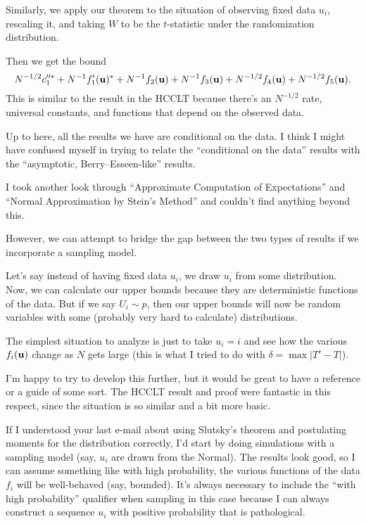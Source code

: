 \documentclass{amsart}
\begin{document}
Similarly, we apply our theorem to the situation of observing fixed data $u_i$, rescaling it, and
taking $W$ to be the $t$-statistic under the randomization distribution.

Then we get the bound
\begin{equation*}
  N^{-1/2} c''^\ast_1 + N^{-1} f'_1({\bf u})^\ast + N^{-1} f_2({\bf u}) +
  N^{-1} f_3({\bf u}) + N^{-1/2} f_4({\bf u}) + N^{-1/2} f_5({\bf u}).
\end{equation*}
This is similar to the result in the HCCLT because there's an $N^{-1/2}$ rate, universal constants,
and functions that depend on the observed data.

Up to here, all the results we have are conditional on the data.  I think I might have confused myself
in trying to relate the ``conditional on the data'' results with the ``asymptotic, Berry--Esseen-like'' results.

I took another look through ``Approximate Computation of Expectations'' and ``Normal Approximation by Stein's Method''
and couldn't find anything beyond this.

However, we can attempt to bridge the gap between the two types of results if we incorporate a sampling model.

Let's say instead of having fixed data $u_i$, we draw $u_i$ from some distribution.  Now, we can calculate our upper bounds
because they are deterministic functions of the data.  But if we say $U_i \sim p$, then our upper bounds will now be
random variables with some (probably very hard to calculate) distributions.

The simplest situation to analyze is just to take $u_i = i$ and see how the various $f_i({\bf u})$ change as $N$ gets large
(this is what I tried to do with $\delta = \max |T'-T|$).

I'm happy to try to develop this further, but it would be great to have a reference or a guide of some sort.  The HCCLT
result and proof were fantastic in this respect, since the situation is so similar and a bit more basic.

If I understood your last e-mail about using Slutsky's theorem and postulating moments for the distribution correctly,
I'd start by doing simulations with a sampling model (say, $u_i$ are drawn from the Normal).  The results look good,
so I can assume something like with high probability, the various functions of the data $f_i$ will be well-behaved (say, bounded).
It's always necessary to include the ``with high probability'' qualifier when sampling in this case because
I can always construct a sequence $u_i$ with positive probability that is pathological.
\end{document}
